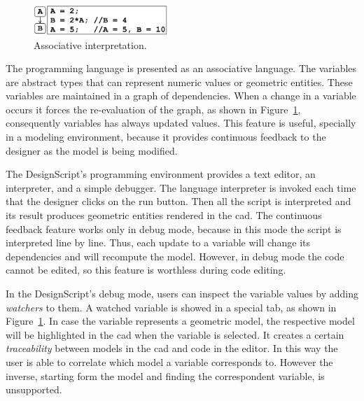 \begin{figure}
  \vspace{-25pt}
  \begin{center}
    \includegraphics[width=0.45\textwidth]{img/designscript}
  \end{center}
  \vspace{-20pt}
 \caption{Associative interpretation.}  
  \vspace{-20pt}
    \label{fig:designscript}
\end{figure}

The programming language is presented as an associative language. The variables are abstract types that can represent numeric values or geometric entities. These variables are maintained in a graph of dependencies. When a change in a variable occurs it forces the re-evaluation of the graph, as shown in Figure~\ref{fig:designscript}, consequently variables has always updated values. This feature is useful, specially in a modeling environment, because it provides continuous feedback to the designer as the model is being modified.

The DesignScript's programming environment provides a text editor, an interpreter, and a simple debugger. The language interpreter is invoked each time that the designer clicks on the run button. Then all the script is interpreted and its result produces geometric entities rendered in the \ac{cad}. The continuous feedback feature works only in debug mode, because in this mode the script is interpreted line by line. Thus, each update to a variable will change its dependencies and will recompute the model. However, in debug mode the code cannot be edited, so this feature is worthless during code editing.

In the DesignScript's debug mode, users can inspect the variable values by adding \textit{watchers} to them. A watched variable is showed in a special tab, as shown in Figure~\ref{fig:designscript}. In case the variable represents a geometric model, the respective model will be highlighted in the \ac{cad} when the variable is selected. It creates a certain \textit{traceability} between models in the \ac{cad} and code in the editor. In this way the user is able to correlate which model a variable corresponds to. However the inverse, starting form the model and finding the correspondent variable, is unsupported.

